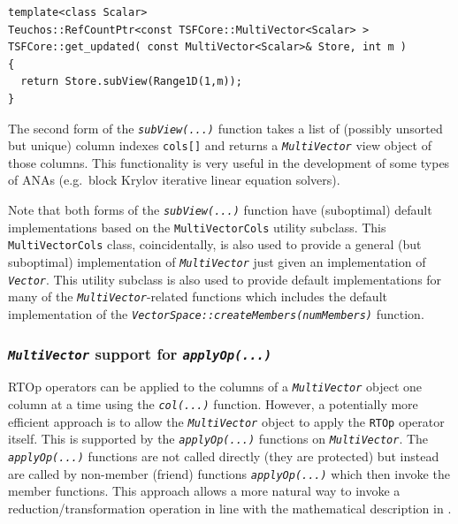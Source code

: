 {\scriptsize\begin{verbatim}
template<class Scalar>
Teuchos::RefCountPtr<const TSFCore::MultiVector<Scalar> >
TSFCore::get_updated( const MultiVector<Scalar>& Store, int m )
{
  return Store.subView(Range1D(1,m));
}
\end{verbatim}}

The second form of the {}\texttt{\textit{subView(...)}} function takes a
list of (possibly unsorted but unique) column indexes
{}\texttt{cols[]} and returns a {}\texttt{\textit{Multi\-Vector}} view
object of those columns.  This functionality is very useful in the
development of some types of ANAs (e.g.~block Krylov iterative linear
equation solvers).

Note that both forms of the {}\texttt{\textit{subView(...)}} function
have (suboptimal) default implementations based on the
{}\texttt{MultiVectorCols} utility subclass.  This
{}\texttt{MultiVectorCols} class, coincidentally, is also used to
provide a general (but suboptimal) implementation of
{}\texttt{\textit{Multi\-Vector}} just given an implementation of
{}\texttt{\textit{Vector}}.  This utility subclass is also used to
provide default implementations for many of the
{}\texttt{\textit{Multi\-Vector}}-related functions which includes the
default implementation of the
{}\texttt{\textit{VectorSpace\-::createMembers(numMembers)}} function.

%
\subsubsection{\texttt{\textit{Multi\-Vector}} support for {}\texttt{\textit{applyOp(\-...)}}}
\label{tsfcore:sec:multi_vec_apply_op}
%

RTOp operators can be applied to the columns of a
{}\texttt{\textit{Multi\-Vector}} object one column at a time using
the {}\texttt{\textit{col(...)}} function.  However, a potentially more
efficient approach is to allow the {}\texttt{\textit{Multi\-Vector}}
object to apply the {}\texttt{RTOp} operator itself.  This is
supported by the {}\texttt{\textit{applyOp(\-...)}} functions on
{}\texttt{\textit{Multi\-Vector}}.  The
{}\texttt{\textit{applyOp(\-...)}} functions are not called directly
(they are protected) but instead are called by non-member (friend)
functions {}\texttt{\textit{applyOp(\-...)}} which then invoke the
member functions.  This approach allows a more natural way to invoke a
reduction/transformation operation in line with the mathematical
description in {}\cite{ref:rtop_toms}.

